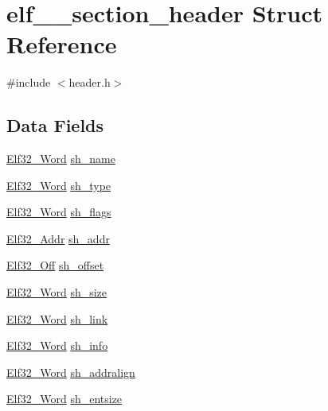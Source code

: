 \hypertarget{structelf__32__section__header}{
\section{elf\_\_\-section\_\-header Struct Reference}
\label{structelf__32__section__header}
}


{\ttfamily \#include $<$header.h$>$}

\subsection*{Data Fields}
\begin{DoxyCompactItemize}
\item 
\hyperlink{header_8h_aaf2adb6079d594afee7de40cee594c34}{Elf32\_\-Word} \hyperlink{structelf__32__section__header_a92c7b4858577346a54631f8a41cf6320}{sh\_\-name}
\item 
\hyperlink{header_8h_aaf2adb6079d594afee7de40cee594c34}{Elf32\_\-Word} \hyperlink{structelf__32__section__header_aa19ec0f26eb1c4e79de6f1b7e7362d7c}{sh\_\-type}
\item 
\hyperlink{header_8h_aaf2adb6079d594afee7de40cee594c34}{Elf32\_\-Word} \hyperlink{structelf__32__section__header_aec02582689021112adef07064ded4494}{sh\_\-flags}
\item 
\hyperlink{header_8h_a6041cee195469c34b94c8605b53a98f9}{Elf32\_\-Addr} \hyperlink{structelf__32__section__header_a39df760c684f21d4e3112988f5576b9f}{sh\_\-addr}
\item 
\hyperlink{header_8h_aa29786fd537fb0970d39bb3b9ed48e96}{Elf32\_\-Off} \hyperlink{structelf__32__section__header_a5f1a922a39c88958afb39326f293389c}{sh\_\-offset}
\item 
\hyperlink{header_8h_aaf2adb6079d594afee7de40cee594c34}{Elf32\_\-Word} \hyperlink{structelf__32__section__header_ae0bb6c0f10c7b5e9242b89f8f02a5acb}{sh\_\-size}
\item 
\hyperlink{header_8h_aaf2adb6079d594afee7de40cee594c34}{Elf32\_\-Word} \hyperlink{structelf__32__section__header_a969ab9a409cd63670a32c66e8ce2df73}{sh\_\-link}
\item 
\hyperlink{header_8h_aaf2adb6079d594afee7de40cee594c34}{Elf32\_\-Word} \hyperlink{structelf__32__section__header_a8ae1c8f02eff2a0cd819d7e5db333ec9}{sh\_\-info}
\item 
\hyperlink{header_8h_aaf2adb6079d594afee7de40cee594c34}{Elf32\_\-Word} \hyperlink{structelf__32__section__header_a6f0e976649e646aa6b9ebbf041602685}{sh\_\-addralign}
\item 
\hyperlink{header_8h_aaf2adb6079d594afee7de40cee594c34}{Elf32\_\-Word} \hyperlink{structelf__32__section__header_abea1c9ab55479738b3d4293d5c983a01}{sh\_\-entsize}
\end{DoxyCompactItemize}


